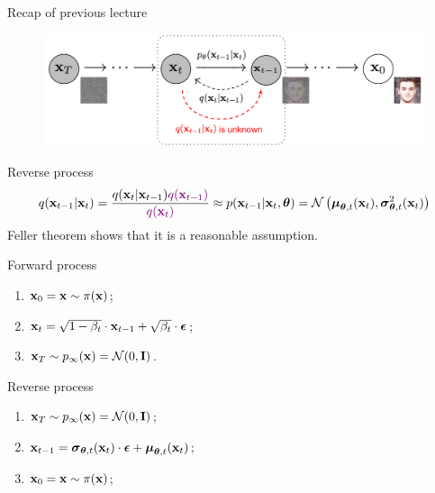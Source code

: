 

\usepackage{tikz}

\usetikzlibrary{arrows,shapes,positioning,shadows,trees}

\begin{frame}
\titlepage
\end{frame}
\begin{frame}{Recap of previous lecture}
	\vspace{-0.3cm}
	\begin{figure}
		\includegraphics[width=0.8\linewidth]{figs/DDPM}
	\end{figure}
	\vspace{-0.5cm}
	\begin{block}{Reverse process}
		\vspace{-0.5cm}
		{\small
		\[
			q(\mathbf{x}_{t-1}|\mathbf{x}_{t}) = \frac{q(\mathbf{x}_{t}|\mathbf{x}_{t-1}) {\color{violet}q(\mathbf{x}_{t-1})}}{{\color{violet}q(\mathbf{x}_{t})}} \approx p(\mathbf{x}_{t - 1} | \mathbf{x}_t, \boldsymbol{\theta}) = \mathcal{N} \left(\boldsymbol{\mu}_{\boldsymbol{\theta}, t}(\mathbf{x}_t), \boldsymbol{\sigma}_{\boldsymbol{\theta}, t}^2(\mathbf{x}_t)\right)
		\]}
		{\color{gray}Feller theorem shows that it is a reasonable assumption.}
	\end{block}
	\begin{minipage}{0.5\linewidth}
		\begin{block}{Forward process}
			\begin{enumerate}
				\item $\mathbf{x}_0 = \mathbf{x} \sim \pi(\mathbf{x})$;
				\item $\mathbf{x}_t = \sqrt{1 - \beta_t} \cdot \mathbf{x}_{t - 1} + \sqrt{\beta_t} \cdot \boldsymbol{\epsilon}$;
				\item $\mathbf{x}_T \sim p_{\infty}(\mathbf{x}) = \mathcal{N}(0, \mathbf{I})$.
			\end{enumerate}
		\end{block}
	\end{minipage}%
	\begin{minipage}{0.55\linewidth}
		\begin{block}{Reverse process}
			\begin{enumerate}
				\item $\mathbf{x}_T \sim p_{\infty}(\mathbf{x}) = \mathcal{N}(0, \mathbf{I})$;
				\item $\mathbf{x}_{t - 1} = \boldsymbol{\sigma}_{\boldsymbol{\theta}, t}(\mathbf{x}_t) \cdot \boldsymbol{\epsilon} + \boldsymbol{\mu}_{\boldsymbol{\theta}, t}(\mathbf{x}_t)$;
				\item $\mathbf{x}_0 = \mathbf{x} \sim \pi(\mathbf{x})$;
			\end{enumerate}
		\end{block}
	\end{minipage}
\end{frame}
